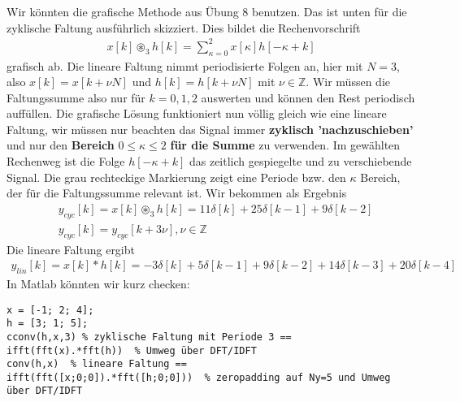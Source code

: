 \begin{Ansatz}
Wir könnten die grafische Methode aus Übung 8 benutzen. Das ist unten
für die zyklische Faltung ausführlich skizziert.
Dies bildet die Rechenvorschrift
\begin{align}
x[k] \circledast_3 h[k] = \sum_{\kappa=0}^{2} x[\kappa] h[-\kappa + k]
\end{align}
grafisch ab.
Die lineare Faltung nimmt periodisierte Folgen an, hier mit $N=3$, also
$x[k] = x[k+\nu N]$ und $h[k] = h[k+\nu N]$ mit $\nu\in\mathbb{Z}$.
Wir müssen die Faltungssumme also nur für $k=0,1,2$ auswerten und können
den Rest periodisch auffüllen.
%
Die grafische Lösung funktioniert nun völlig gleich wie eine lineare Faltung,
wir müssen nur beachten das Signal immer \textbf{zyklisch 'nachzuschieben'} und nur den
\textbf{Bereich} $0 \leq \kappa \leq 2$ \textbf{für die Summe} zu verwenden.
%
Im gewählten Rechenweg ist die Folge $h[-\kappa+k]$ das zeitlich gespiegelte und zu
verschiebende Signal.
%
Die grau rechteckige Markierung zeigt eine Periode bzw. den $\kappa$ Bereich,
der für die Faltungssumme relevant ist.
%
Wir bekommen als Ergebnis
\begin{align}
&y_{cyc}[k] = x[k] \circledast_3 h[k] = 11\delta[k] + 25\delta[k-1] + 9\delta[k-2]\nonumber\\
&y_{cyc}[k] = y_{cyc}[k + 3\nu], \nu\in\mathbb{Z}
\end{align}
%
Die lineare Faltung ergibt
\begin{align}
y_{lin}[k] = x[k] \ast h[k] = -3\delta[k] + 5\delta[k-1] + 9\delta[k-2] + 14\delta[k-3] + 20\delta[k-4]
\end{align}
%
In Matlab könnten wir kurz checken:
\begin{verbatim}
x = [-1; 2; 4];
h = [3; 1; 5];
cconv(h,x,3) % zyklische Faltung mit Periode 3 ==
ifft(fft(x).*fft(h))  % Umweg über DFT/IDFT
conv(h,x)  % lineare Faltung ==
ifft(fft([x;0;0]).*fft([h;0;0]))  % zeropadding auf Ny=5 und Umweg über DFT/IDFT
\end{verbatim}


\end{Ansatz}

